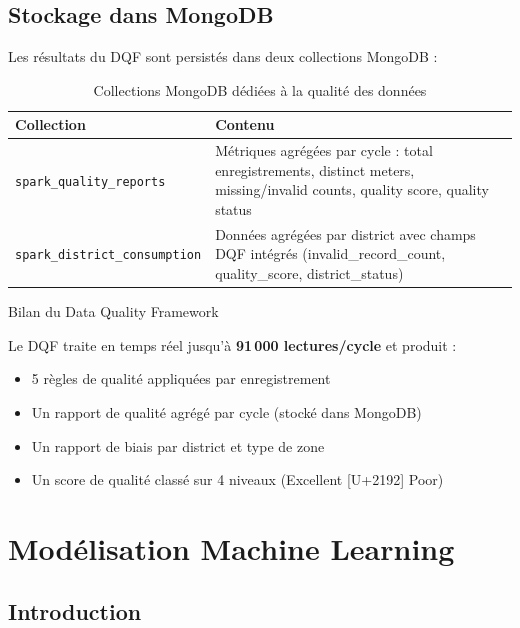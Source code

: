 \documentclass[12pt,a4paper]{report}
\begin{document}
\section{Stockage dans MongoDB}

Les r\'{e}sultats du DQF sont persist\'{e}s dans deux collections MongoDB :

\begin{table}[H]
\centering
\caption{Collections MongoDB d\'{e}di\'{e}es \`{a} la qualit\'{e} des donn\'{e}es}
\label{tab:mongo_dqf}
\renewcommand{\arraystretch}{1.4}
\begin{tabularx}{\textwidth}{|l|X|}
\hline
\rowcolor{primaryblue!20}
\textbf{Collection} & \textbf{Contenu} \\
\hline
\texttt{spark\_quality\_reports} & M\'{e}triques agr\'{e}g\'{e}es par cycle : total enregistrements, distinct meters, missing/invalid counts, quality score, quality status \\
\texttt{spark\_district\_consumption} & Donn\'{e}es agr\'{e}g\'{e}es par district avec champs DQF int\'{e}gr\'{e}s (invalid\_record\_count, quality\_score, district\_status) \\
\hline
\end{tabularx}
\end{table}

\begin{resultbox}Bilan du Data Quality Framework

Le DQF traite en temps r\'{e}el jusqu'\`{a} \textbf{91\,000 lectures/cycle} et produit :
\begin{itemize}[noitemsep]
  \item 5 r\`{e}gles de qualit\'{e} appliqu\'{e}es par enregistrement
  \item Un rapport de qualit\'{e} agr\'{e}g\'{e} par cycle (stock\'{e} dans MongoDB)
  \item Un rapport de biais par district et type de zone
  \item Un score de qualit\'{e} class\'{e} sur 4 niveaux (Excellent [U+2192] Poor)
\end{itemize}
\end{resultbox}



\chapter{Mod\'{e}lisation Machine Learning}
\label{chap:ml}

\section{Introduction}
\end{document}
